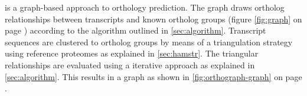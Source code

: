 \label{sec:graph}
\pname is a graph-based approach to orthology prediction. The graph draws
ortholog relationships between transcripts and known ortholog groups (figure
\ref{fig:graph} on page \pageref{fig:graph}) according to the algorithm outlined
in \autoref{sec:algorithm}.  Transcript sequences are clustered to ortholog
groups by means of a triangulation strategy using reference proteomes as
explained in \autoref{sec:hamstr}. The triangular relationships are evaluated
using a iterative approach as explained in \autoref{sec:algorithm}. This results
in a graph as shown in \autoref{fig:orthograph-graph} on page
\pageref{fig:orthograph-graph}.




